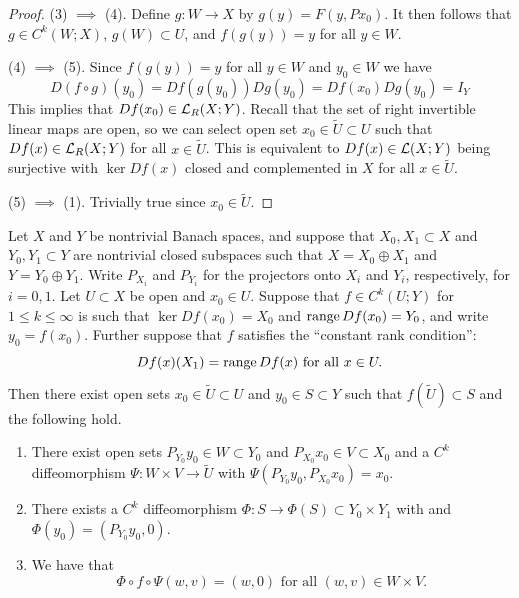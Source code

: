 \documentclass[a4paper]{article}
\begin{document}
\begin{proof}
  (3) $\implies$ (4). Define $g : W \to X$ by
  $g(y) = F(y, P x_0)$. It then follows that
  $g \in C^k(W; X)$, $g(W) \subset U$,
  and $f(g(y)) = y$ for all $y \in W$.

  (4) $\implies$ (5). Since $f(g(y)) = y$ for all $y \in W$
  and $y_0 \in W$ we have
  \[
    D(f \circ g) (y_0) = Df(g(y_0)) Dg(y_0)
    = Df(x_0) Dg(y_0) = I_Y
  \]
  This implies that $Df(x_0) \in \mathcal{L}_R (X; Y)$. Recall that the set of
  right invertible linear maps are open, so we can select open set $x_0
  \in \tilde{U} \subset U$ such that $Df(x) \in \mathcal{L}_R(X; Y)$ for all $x \in
  \tilde{U}$. This is equivalent to $Df(x) \in \mathcal{L}(X; Y)$ being surjective
  with $\ker Df(x)$ closed and complemented in $X$ for all $x \in
  \tilde{U}$.

  (5) $\implies$ (1). Trivially true since $x_0 \in \tilde{U}$.
\end{proof}

\begin{thm}
  Let $X$ and $Y$ be nontrivial Banach spaces, and suppose
  that $X_0,X_1 \subset X$ and $Y_0,Y_1 \subset Y$ are
  nontrivial closed subspaces such that $X = X_0 \oplus
    X_1$ and $Y = Y_0 \oplus Y_1$.  Write $P_{X_i}$ and
  $P_{Y_i}$ for the projectors onto $X_i$ and $Y_i$,
  respectively, for $i=0,1$.  Let $U \subset X$ be
  open and $x_0 \in U$.  Suppose that $f \in C^k(U;Y)$
  for $1 \le k\le \infty$ is such that $\ker Df(x_0) =
    X_0$ and $\operatorname{range} Df(x_0) = Y_0$, and write $y_0 = f(x_0)$.
  Further suppose that $f$ satisfies the ``constant rank
  condition'':
  \[
    Df(x) (X_1) = \operatorname{range} Df(x) \text{ for all }x \in U.
  \]
  Then there exist open sets $x_0 \in \tilde{U} \subset U$ and $y_0 \in S
  \subset Y$ such that $f(\tilde{U}) \subset S$ and the following hold.
  \begin{enumerate}
    \item There exist open sets $P_{Y_0} y_0 \in W \subset Y_0$ and
          $P_{X_0} x_0 \in V \subset X_0$ and a $C^k$ diffeomorphism
          $\Psi: W \times V \to \tilde{U}$ with $\Psi(P_{Y_0} y_0, P_{X_0}
          x_0) = x_0$.

    \item There exists a $C^k$ diffeomorphism $\Phi : S \to \Phi(S)
          \subset Y_0 \times Y_1$ with and $\Phi(y_0) = (P_{Y_0} y_0, 0)$.

    \item We have that
          \[
            \Phi \circ f \circ \Psi(w,v) = (w,0) \text{ for all }
            (w, v) \in W \times V.
          \]
  \end{enumerate}
\end{thm}
\end{document}
